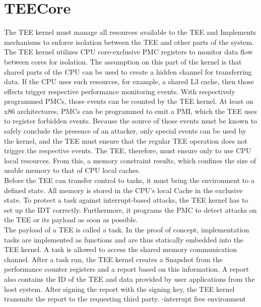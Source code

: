 \section{TEECore}
\label{sec:30:tee_kernel}

The TEE kernel must manage all resources available to the  TEE and Implements
mechanisms to enforce isolation between the TEE and other parts of the system.\\

The TEE kernel utilizes CPU core-exclusive PMC registers to monitor data flow
between cores for isolation. The assumption on this part of the kernel is that
shared parts of the CPU can be used to create a hidden channel for transferring
data. If the CPU uses such resources, for example, a shared L3 cache, then those
effects trigger respective performance monitoring events. With respectively
programmed PMCs, those events can be counted by the TEE kernel. At least on x86
architectures, PMCs can be programmed to emit a PMI, which the TEE uses to
register forbidden events. Because the source of those events must be known to
safely conclude the presence of an attacker, only special events can be used by
the kernel, and the TEE must ensure that the regular TEE operation does not
trigger the respective events. The TEE, therefore, must ensure only to use CPU
local resources. From this, a memory constraint results, which confines the size
of usable memory to that of CPU local caches.\\

Before the TEE can transfer control to tasks, it must bring the environment to a
defined state. All memory is stored in the CPU's local Cache in the exclusive
state. To protect a task against interrupt-based attacks, the TEE kernel has to
set up the IDT correctly. Furthermore, it programs the PMC to detect attacks on
the TEE or its payload as soon as possible. \\

The payload of a TEE is called a task. In the proof of concept, implementation
tasks are implemented as functions and are thus statically embedded into the TEE
kernel. A task is allowed to access the shared memory communication channel.
After a task run, the TEE kernel creates a Snapshot from the performance counter
registers and a report based on this information. A report also contains the ID
of the TEE and data provided by user applications from the host system. After
signing the report with the signing key, the TEE kernel transmits the report to
the requesting third party.
-interrupt free environment

